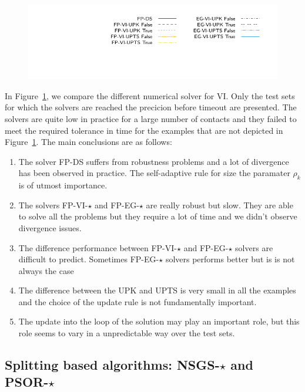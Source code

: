 \begin{figure}[htbp]
{\includegraphics[width=\legendwidth]{../figure/VI/UpdateRule/1.0e-08/50/time/profile-Chain_legend.pdf}} 
\label{fig:VI/UpdateRule}
\end{figure}





In Figure~\ref{fig:VI/UpdateRule}, we compare the different numerical solver for VI. Only the test sets for which the solvers are reached the precicion before timeout are presented. The solvers are quite low in practice for a large number of contacts and they failed to meet the required tolerance in time for the examples that are not depicted in Figure~\ref{fig:VI/UpdateRule}. The main conclusions are as follows:
\begin{enumerate}
\item The solver {\sf FP-DS} suffers from robustness problems and a lot of divergence has been observed in practice. The self-adaptive rule for size the paramater $\rho_k$ is of utmost importance.
\item The solvers {\sf FP-VI-$\star$} and {\sf FP-EG-$\star$} are really robust but slow. They are able to solve all the problems but they require a lot of time and we didn't observe divergence issues.
\item The difference performance between {\sf FP-VI-$\star$} and {\sf FP-EG-$\star$} solvers are difficult to predict. Sometimes  {\sf FP-EG-$\star$} solvers performs better but is is not always the case
\item The difference between the {\sf UPK} and {\sf UPTS} is very small in all the examples and the choice of the update rule is not fundamentally important. 
\item The update into the loop of the solution may play an important role, but this role seems to vary in a unpredictable way over the test sets.
\end{enumerate}


\subsection{Splitting based algorithms: {\sf NSGS-$\star$} and {\sf PSOR-$\star$}}

